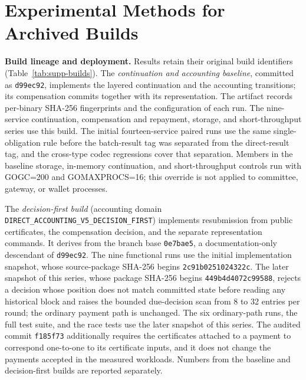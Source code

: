 \section{Experimental Methods for Archived Builds}
\label{sec:supp-methods}

\noindent\textbf{Build lineage and deployment.}
Results retain their original build identifiers (Table~\ref{tab:supp-builds}). The
\emph{continuation and accounting baseline}, committed as \texttt{d99ec92},
implements the layered continuation and the accounting transitions; its
compensation commits together with its representation. The artifact records
per-binary SHA-256 fingerprints and the configuration of each run. The
nine-service continuation, compensation and repayment, storage, and
short-throughput series use this build. The initial fourteen-service paired
runs use the same single-obligation rule before the batch-result tag was
separated from the direct-result tag, and the cross-type codec regressions
cover that separation. Members in the baseline storage, in-memory
continuation, and short-throughput controls run with GOGC=200 and
GOMAXPROCS=16; this override is not applied to committee, gateway, or wallet
processes.

The \emph{decision-first build} (accounting domain
\texttt{DIRECT\_ACCOUNTING\_V5\_DECISION\_FIRST}) implements resubmission from
public certificates, the compensation decision, and the separate
representation commands. It derives from the branch base \texttt{0e7bae5}, a
documentation-only descendant of \texttt{d99ec92}. The nine functional runs
use the initial implementation snapshot, whose source-package SHA-256 begins
\texttt{2c91b0251024322c}. The later snapshot of this series, whose package SHA-256 begins
\texttt{449b4d4072c99588}, rejects a decision whose position does not match
committed state before reading any historical block and raises the bounded
due-decision scan from 8 to 32 entries per round; the ordinary payment path is
unchanged. The six ordinary-path runs, the full test suite, and the race tests
use the later snapshot of this series. The audited commit \texttt{f185f73} additionally
requires the certificates attached to a payment to correspond one-to-one to
its certificate inputs, and it does not change the payments accepted in the
measured workloads. Numbers from the baseline and decision-first builds are
reported separately.


